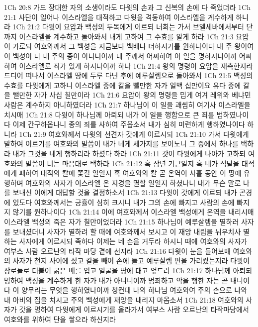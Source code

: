 1Ch 20:8  가드 장대한 자의 소생이라도 다윗의 손과 그 신복의 손에 다 죽었더라
1Ch 21:1  사단이 일어나 이스라엘을 대적하고 다윗을 격동하여 이스라엘을 계수하게 하니라
1Ch 21:2  다윗이 요압과 백성의 두목에게 이르되 너희는 가서 브엘세바에서부터 단까지 이스라엘을 계수하고 돌아와서 내게 고하여 그 수효를 알게 하라
1Ch 21:3  요압이 가로되 여호와께서 그 백성을 지금보다 백배나 더하시기를 원하나이다 내 주 왕이여 이 백성이 다 내 주의 종이 아니니이까 내 주께서 어찌하여 이 일을 명하시나이까 어찌하여 이스라엘로 죄가 있게 하시나이까 하나
1Ch 21:4  왕의 명령이 요압을 재촉한지라 드디어 떠나서 이스라엘 땅에 두루 다닌 후에 예루살렘으로 돌아와서
1Ch 21:5  백성의 수효를 다윗에게 고하니 이스라엘 중에 칼을 뺄만한 자가 일백 십만이요 유다 중에 칼을 뺄만한 자가 사십 칠만이라
1Ch 21:6  요압이 왕의 명령을 밉게 여겨 레위와 베냐민 사람은 계수하지 아니하였더라
1Ch 21:7  하나님이 이 일을 괘씸히 여기사 이스라엘을 치시매
1Ch 21:8  다윗이 하나님께 아뢰되 내가 이 일을 행함으로 큰 죄를 범하였나이다 이제 간구하옵나니 종의 죄를 사하여 주옵소서 내가 심히 미련하게 행하였나이다 하니라
1Ch 21:9  여호와께서 다윗의 선견자 갓에게 이르시되
1Ch 21:10  가서 다윗에게 말하여 이르기를 여호와의 말씀이 내가 네게 세가지를 보이노니 그 중에서 하나를 택하라 내가 그것을 네게 행하리라 하셨다 하라
1Ch 21:11  갓이 다윗에게 나아가 고하되 여호와의 말씀이 너는 마음대로 택하라
1Ch 21:12  혹 삼년 기근일지 혹 네가 석달을 대적에게 패하여 대적의 칼에 쫓길 일일지 혹 여호와의 칼 곧 온역이 사흘 동안 이 땅에 유행하며 여호와의 사자가 이스라엘 온 지경을 멸할 일일지 하셨나니 내가 무슨 말로 나를 보내신 이에게 대답할 것을 결정하소서
1Ch 21:13  다윗이 갓에게 이르되 내가 곤경에 있도다 여호와께서는 긍휼이 심히 크시니 내가 그의 손에 빠지고 사람의 손에 빠지지 않기를 원하나이다
1Ch 21:14  이에 여호와께서 이스라엘 백성에게 온역을 내리시매 이스라엘 백성의 죽은 자가 칠만이었더라
1Ch 21:15  하나님이 예루살렘을 멸하러 사자를 보내셨더니 사자가 멸하려 할 때에 여호와께서 보시고 이 재앙 내림을 뉘우치사 멸하는 사자에게 이르시되 족하다 이제는 네 손을 거두라 하시니 때에 여호와의 사자가 여부스 사람 오르난의 타작 마당 곁에 선지라
1Ch 21:16  다윗이 눈을 들어보매 여호와의 사자가 천지 사이에 섰고 칼을 빼어 손에 들고 예루살렘 편을 가리켰는지라 다윗이 장로들로 더불어 굵은 베를 입고 얼굴을 땅에 대고 엎드려
1Ch 21:17  하나님께 아뢰되 명하여 백성을 계수하게 한 자가 내가 아니니이까 범죄하고 악을 행한 자는 곧 내니이다 이 양무리는 무엇을 행하였나이까 청컨대 나의 하나님 여호와여 주의 손으로 나와 내 아비의 집을 치시고 주의 백성에게 재앙을 내리지 마옵소서
1Ch 21:18  여호와의 사자가 갓을 명하여 다윗에게 이르시기를 올라가서 여부스 사람 오르난의 타작마당에서 여호와를 위하여 단을 쌓으라 하신지라
